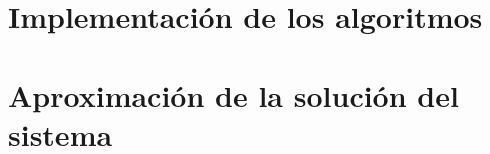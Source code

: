 \section{Implementación de los algoritmos}
\resetallcounters

\clearpage

\section{Aproximación de la solución del sistema}
\resetallcounters

\clearpage

